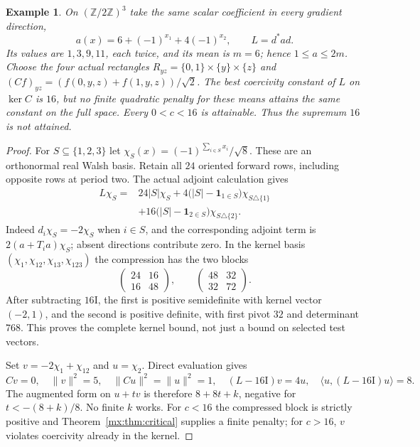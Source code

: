 \documentclass[11pt]{article}
\newtheorem{matrixExample}[theorem]{Example}
\providecommand{\id}{\mathrm I}
\begin{document}
\begin{matrixExample}\label{mx:ex:rectangle}
On $(\mathbb Z/2\mathbb Z)^3$ take the same scalar coefficient in every
gradient direction,
\[
 a(x)=6+(-1)^{x_1}+4(-1)^{x_2},\qquad L=d^*ad.
\]
Its values are $1,3,9,11$, each twice, and its mean is $m=6$; hence
$1\leq a\leq2m$. Choose the four actual rectangles
$R_{yz}=\{0,1\}\times\{y\}\times\{z\}$ and
$(Cf)_{yz}=(f(0,y,z)+f(1,y,z))/\sqrt2$.
The best coercivity constant of $L$ on $\ker C$ is $16$, but no finite
quadratic penalty for these means attains the same constant on the full
space. Every $0<c<16$ is attainable. Thus the supremum $16$ is not attained.
\end{matrixExample}
\begin{proof}
For $S\subseteq\{1,2,3\}$ let
$\chi_S(x)=(-1)^{\sum_{i\in S}x_i}/\sqrt8$. These are an orthonormal real
Walsh basis. Retain all $24$ oriented forward rows, including opposite rows
at period two. The actual adjoint calculation gives
\begin{align*}
 L\chi_S={}&24|S|\chi_S
 +4\bigl(|S|-\boldsymbol1_{1\in S}\bigr)\chi_{S\triangle\{1\}}\\
 &+16\bigl(|S|-\boldsymbol1_{2\in S}\bigr)\chi_{S\triangle\{2\}}.
\end{align*}
Indeed $d_i\chi_S=-2\chi_S$ when $i\in S$, and the corresponding
adjoint term is $2(a+T_i a)\chi_S$; absent directions contribute zero.
In the kernel basis $(\chi_1,\chi_{12},\chi_{13},\chi_{123})$ the compression
has the two blocks
\[
 \begin{pmatrix}24&16\\16&48\end{pmatrix},\qquad
 \begin{pmatrix}48&32\\32&72\end{pmatrix}.
\]
After subtracting $16\id$, the first is positive semidefinite with kernel
vector $(-2,1)$, and the second is positive definite, with first pivot $32$
and determinant $768$. This proves the complete kernel bound, not just a
bound on selected test vectors.

Set $v=-2\chi_1+\chi_{12}$ and $u=\chi_2$. Direct evaluation gives
\[
 Cv=0,\quad\|v\|^2=5,\quad\|Cu\|^2=\|u\|^2=1,
 \quad(L-16\id)v=4u,\quad\langle u,(L-16\id)u\rangle=8.
\]
The augmented form on $u+tv$ is therefore $8+8t+k$, negative for
$t<-(8+k)/8$. No finite $k$ works. For $c<16$ the compressed block is
strictly positive and Theorem~\ref{mx:thm:critical} supplies a finite penalty;
for $c>16$, $v$ violates coercivity already in the kernel.
\end{proof}
\end{document}

